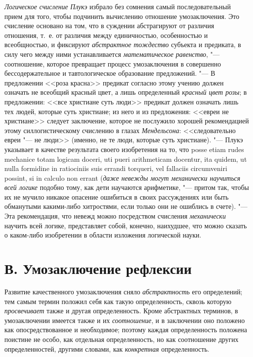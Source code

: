 {\em Логическое счисление Плукэ}
избрало без сомнения самый последовательный прием для того,
чтобы подчинить вычислению отношение умозаключения. Это счисление основано
на том, что в суждении абстрагируют от различия отношения, т.~е. от
различия между единичностью, особенностью и всеобщностью, и фиксируют
{\em абстрактное тождество}
субъекта и предиката, в силу чего между ними устанавливается
{\em математическое равенство}, "---
соотношение, которое превращает процесс умозаключения в
совершенно бессодержательное и тавтологическое образование предложений. "---
В предложении <<роза красна>> предикат согласно этому учению
должен означать не всеобщий красный цвет, а лишь определенный
{\em красный цвет розы};
в предложении: <<все христиане суть люди>> предикат должен
означать лишь тех людей, которые суть христиане; из него и из предложения:
<<евреи не христиане>> следует заключение, которое не послужило хорошей
рекомендацией этому силлогистическому счислению в глазах
{\em Мендельсона}:
<<следовательно евреи "--- не люди>> (именно, не те
люди, которые суть христиане). "--- Плукэ указывает в качестве
результата своего изобретения на то, что posse etiam rudes mechanice totam
logicam doceri, uti pueri arithmeticam docentur, ita quidem, ut nulla
formidine in ratiociniis suis errandi torqueri, vel fallaciis circumveniri
possint, si in calculo non errant
({\em даже невежды могут механически
научиться всей логике} подобно тому, как дети научаются
арифметике, "--- притом так, чтобы их не мучило никакое
опасение ошибиться в своих рассуждениях или быть обманутыми какими-либо
хитростями, если только они не ошиблись в счете). "--- Эта
рекомендация, что невежд можно посредством счисления
{\em механически} научить
всей логике, представляет собой, конечно, наихудшее, что
можно сказать о каком-либо изобретении в области изложения логической
науки.

\section[В. Умозаключение рефлексии]{В. Умозаключение рефлексии}
Развитие качественного умозаключения сняло
{\em абстрактность} его
определений; тем самым термин положил себя как такую определенность, сквозь
которую {\em просвечивает}
также и другая определенность. Кроме абстрактных терминов, в
умозаключении имеется также и их
{\em соотношение}, и в
заключении оно положено как опосредствованное и необходимое; поэтому каждая
определенность положена поистине не особо, как отдельная определенность, но
как соотношение других определенностей, другими словами, как
{\em конкретная} определенность.

